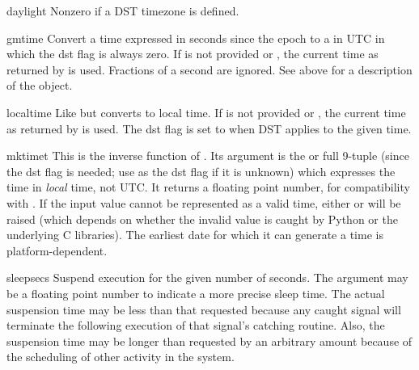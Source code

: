 \begin{datadesc}{daylight}
Nonzero if a DST timezone is defined.
\end{datadesc}

\begin{funcdesc}{gmtime}{}
Convert a time expressed in seconds since the epoch to a 
in UTC in which the dst flag is always zero.  If  is not
provided or , the current time as returned by
 is used.  Fractions of a second are ignored.  See
above for a description of the  object.
\end{funcdesc}

\begin{funcdesc}{localtime}{}
Like  but converts to local time.  If  is
not provided or , the current time as returned by
 is used.  The dst flag is set to  when DST
applies to the given time.
\end{funcdesc}

\begin{funcdesc}{mktime}{t}
This is the inverse function of .  Its argument
is the  or full 9-tuple (since the dst flag is
needed; use  as the dst flag if it is unknown) which
expresses the time in
\emph{local} time, not UTC.  It returns a floating point number, for
compatibility with .  If the input value cannot be
represented as a valid time, either  or
 will be raised (which depends on whether the
invalid value is caught by Python or the underlying C libraries).  The
earliest date for which it can generate a time is platform-dependent.
\end{funcdesc}

\begin{funcdesc}{sleep}{secs}
Suspend execution for the given number of seconds.  The argument may
be a floating point number to indicate a more precise sleep time.
The actual suspension time may be less than that requested because any
caught signal will terminate the  following
execution of that signal's catching routine.  Also, the suspension
time may be longer than requested by an arbitrary amount because of
the scheduling of other activity in the system.
\end{funcdesc}

